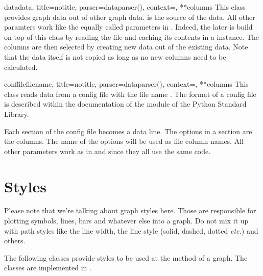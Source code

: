 \begin{classdesc}{data}{data, title=notitle, parser=dataparser(),
                        context={}, **columns}
  This class provides graph data out of other graph data. 
  is the source of the data. All other paramters work like the equally
  called parameters in . Indeed, the later is
  build on top of this class by reading the file and caching its
  contents in a  instance. The columns are then
  selected by creating new data out of the existing data. Note that
  the data itself is not copied as long as no new columns need to be
  calculated.
\end{classdesc}

\begin{classdesc}{conffile}{filename, title=notitle,
                            parser=dataparser(), context={},
                            **columns}
  This class reads data from a config file with the file name
  . The format of a config file is described within the
  documentation of the  module of the Python
  Standard Library.

  Each section of the config file becomes a data line. The options in
  a section are the columns. The name of the options will be used as
  file column names. All other parameters work as in
   and  since they all use
  the same code.
\end{classdesc}

\section{Styles\label{graph:style}}


Please note that we're talking about graph styles here. Those are
responsible for plotting symbols, lines, bars and whatever else into a
graph. Do not mix it up with path styles like the line width, the line
style (solid, dashed, dotted \emph{etc.}) and others.

The following classes provide styles to be used at the 
method of a graph. The classes are implemented in .

